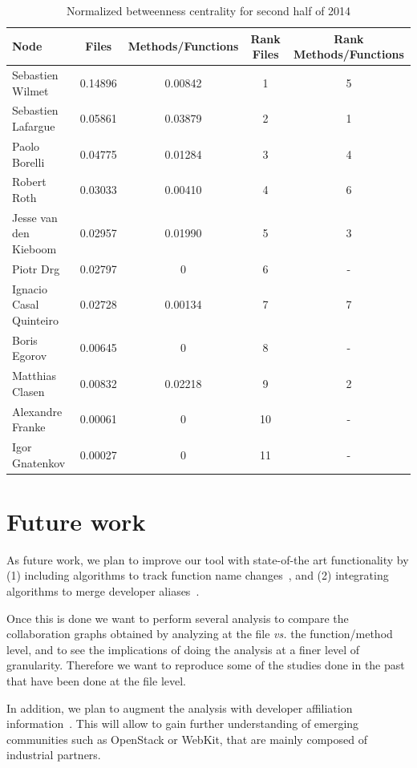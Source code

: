 \documentclass[a4paper]{article}
\begin{document}
\begin{table}[ht]
\begin{center}
\caption{Normalized betweenness centrality for second half of 2014}
\bigskip
\label{tab:2014}
\begin{tabular}{|l|c|c|c|c|}
\hline
Node & Files & Methods/Functions & Rank Files & Rank Methods/Functions  \\ \hline
Sebastien Wilmet & 0.14896 & 0.00842 & 1 & 5 \\ 
Sebastien Lafargue & 0.05861 & 0.03879 & 2 & 1   \\
Paolo Borelli & 0.04775 & 0.01284 & 3 & 4 \\
Robert Roth & 0.03033 & 0.00410 & 4 & 6 \\
Jesse van den Kieboom & 0.02957 & 0.01990 & 5 & 3 \\
Piotr Drg & 0.02797 & 0 & 6 & - \\
Ignacio Casal Quinteiro & 0.02728 & 0.00134 & 7 & 7 \\
Boris Egorov & 0.00645 & 0 & 8 & - \\
Matthias Clasen & 0.00832 & 0.02218 & 9 & 2 \\
Alexandre Franke & 0.00061 & 0 & 10 & - \\
Igor Gnatenkov & 0.00027 & 0 & 11 & - \\
\hline
\end{tabular}
\end{center}
\end{table}


\section{Future work}

As future work, we plan to improve our tool with state-of-the art 
functionality by (1) including algorithms to track function name changes~\cite{godfrey2005using}, and (2) integrating algorithms to merge developer aliases~\cite{kouters2012s}.

Once this is done we want to perform several analysis to compare the 
collaboration graphs obtained by analyzing at the file \emph{vs.} the function/method
level, and to see the implications of doing the analysis at a finer level of
granularity. Therefore we want to reproduce some of the studies done in the past that 
have been done at the file level.

In addition, we plan to augment the analysis with developer affiliation information~\cite{gonzalez2013understanding}. This will allow to gain further understanding of 
emerging communities such as OpenStack or WebKit, that are mainly composed of
industrial partners.
\end{document}
